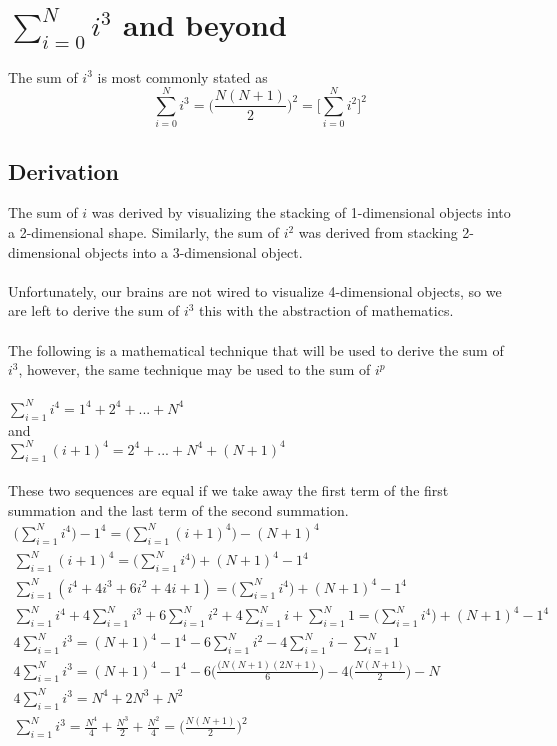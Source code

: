 \documentclass[11pt]{book}
\begin{document}
\section{$\sum\limits_{i=0}^N{i^3}$ and beyond}
The sum of \(i^3\) is most commonly stated as
\[\sum\limits_{i=0}^N{i^3} = \bigg(\frac{N(N+1)}{2} \bigg)^2 = \bigg[\sum\limits_{i=0}^N{i^2} \bigg]^2\]

\subsection{Derivation}
The sum of \(i\) was derived by visualizing the stacking of 1-dimensional objects into a 2-dimensional shape.  Similarly, the sum of \(i^2\) was derived from stacking 2-dimensional objects into a 3-dimensional object. \\
\\
Unfortunately, our brains are not wired to visualize 4-dimensional objects, so we are left to derive the sum of \(i^3\) this with the abstraction of mathematics. \\
\\
The following is a mathematical technique that will be used to derive the sum of \(i^3\), however, the same technique may be used to the sum of \(i^p\)\\
\\
\(\sum\limits_{i=1}^N{i^4} = 1^4 + 2^4 + ... + N^4 \) \\
and \\
\(\sum\limits_{i=1}^N{(i+1)^4} = 2^4 + ... + N^4 + (N+1)^4\) \\
\\
These two sequences are equal if we take away the first term of the first summation and the last term of the second summation. \\
\begin{align*}
\bigg(\sum\limits_{i=1}^N{i^4} \bigg) - 1^4 = \bigg( \sum\limits_{i=1}^N{(i+1)^4} \bigg) -(N+1)^4 \\
\sum\limits_{i=1}^N{(i+1)^4} = \bigg(\sum\limits_{i=1}^N{i^4} \bigg) + (N+1)^4 - 1^4 \\
\sum\limits_{i=1}^N{(i^4 +4i^3 + 6i^2 + 4i +1)} = \bigg(\sum\limits_{i=1}^N{i^4} \bigg) + (N+1)^4 - 1^4 \\
\sum\limits_{i=1}^N{i^4} + 4\sum\limits_{i=1}^N{i^3} + 6\sum\limits_{i=1}^N{i^2} +4\sum\limits_{i=1}^N{i} + \sum\limits_{i=1}^N{1} = \bigg(\sum\limits_{i=1}^N{i^4} \bigg) + (N+1)^4 - 1^4 \\
4\sum\limits_{i=1}^N{i^3} = (N+1)^4 - 1^4  - 6\sum\limits_{i=1}^N{i^2} - 4\sum\limits_{i=1}^N{i} - \sum\limits_{i=1}^N{1} \\
 4\sum\limits_{i=1}^N{i^3} = (N+1)^4 - 1^4  - 6\bigg(\frac{(N(N+1)(2N+1)}{6}\bigg) - 4\bigg(\frac{N(N+1)}{2}\bigg) - N \\
4\sum\limits_{i=1}^N{i^3} = N^4 + 2N^3 + N^2\\
\sum\limits_{i=1}^N{i^3} = \frac{N^4}{4} + \frac{N^3}{2} + \frac{N^2}{4} = \bigg(\frac{N(N+1)}{2}\bigg)^2\\
\end{align*}
\end{document}
